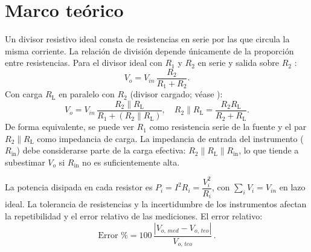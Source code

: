 \documentclass[conference]{IEEEtran}
\begin{document}

\section{Marco teórico}
Un divisor resistivo ideal consta de resistencias en serie por las que circula la misma corriente. La relación de división depende únicamente de la proporción entre resistencias.
Para el divisor ideal con $R_1$ y $R_2$ en serie y salida sobre $R_2$ \cite{ref:khan}:
\begin{equation}
  V_{o} = V_{in}\,\frac{R_2}{R_1 + R_2}.
\end{equation}
Con carga $R_\mathrm{L}$ en paralelo con $R_2$ (divisor cargado; véase \cite{ref:khan}):
\begin{equation}
  V_{o} = V_{in}\,\frac{R_2\parallel R_\mathrm{L}}{R_1 + (R_2\parallel R_\mathrm{L})},\quad R_2\parallel R_\mathrm{L}=\frac{R_2 R_\mathrm{L}}{R_2+R_\mathrm{L}}.
\end{equation}
De forma equivalente, se puede ver $R_1$ como resistencia serie de la fuente y el par $R_2\parallel R_\mathrm{L}$ como impedancia de carga. La impedancia de entrada del instrumento ($R_\mathrm{in}$) debe considerarse parte de la carga efectiva: $R_2\parallel R_\mathrm{L}\parallel R_\mathrm{in}$, lo que tiende a subestimar $V_o$ si $R_\mathrm{in}$ no es suficientemente alta.

La potencia disipada en cada resistor es $P_i=I^2R_i=\dfrac{V_i^2}{R_i}$, con $\sum_i V_i=V_{in}$ en lazo ideal. La tolerancia de resistencias y la incertidumbre de los instrumentos afectan la repetibilidad y el error relativo de las mediciones.
El error relativo:
\begin{equation}
  \text{Error \%} = 100\,\frac{|V_{o,\,med} - V_{o,\,teo}|}{V_{o,\,teo}}\, .
\end{equation}
\end{document}
